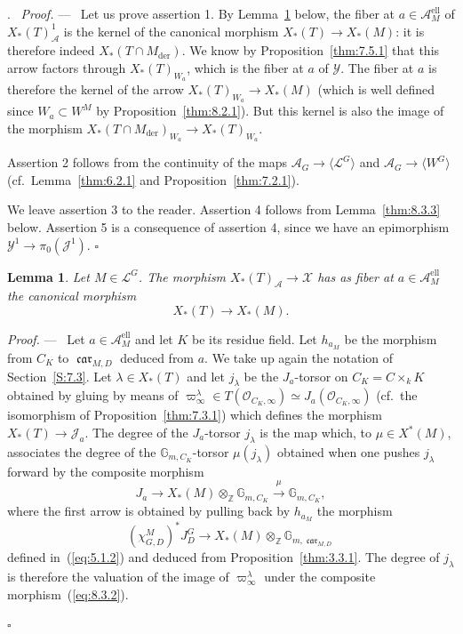 \documentclass[12pt,a4paper,oneside,english,leqno]{smfart}
\makeatletter
\numberwithin{equation}{subsection}
\newcounter{theo}
\numberwithin{theo}{subsection}
\newenvironment{paragr}[1][]{\medskip\refstepcounter{subsection}%
  \par\noindent\hspace*{\parindent}\thesubsection.\ \emph{#1}%
  \@ifundefined{@empty}{}{}\ignorespaces}{\medskip}
\theoremstyle{plain}
\newtheorem{lemma}[theo]{Lemma}
\theoremstyle{definition}
\theoremstyle{remark}
\newenvironment{preuve}[1][]{\medskip\noindent\textit{Proof.} #1 ---\ }%
  {\hfill\ensuremath{\square}\medskip}
\DeclareMathOperator{\der}{der}
\DeclareMathOperator{\el}{ell}
\DeclareMathOperator{\car}{\mathfrak{car}}
\newcommand{\ZZ}{\mathbb{Z}}
\newcommand{\oc}{\mathcal{O}}
\newcommand{\yc}{\mathcal{Y}}
\newcommand{\lc}{\mathcal{L}}
\newcommand{\Ac}{\mathcal{A}}
\newcommand{\Jc}{\mathcal{J}}
\newcommand{\xc}{\mathcal{X}}
\newcommand{\bg}{\langle}
\newcommand{\bd}{\rangle}
\makeatother
\begin{document}
\begin{paragr}
\begin{preuve}
Let us prove assertion 1. By Lemma~\ref{thm:8.3.2} below, the fiber at $a\in\Ac_M^{\el}$ of $X_*(T)^1_{\Ac}$ is the kernel of the canonical morphism $X_*(T)\to X_*(M)$: it is therefore indeed $X_*(T\cap M_{\der})$. We know by Proposition~\ref{thm:7.5.1} that this arrow factors through $X_*(T)_{W_a}$, which is the fiber at $a$ of $\yc$. The fiber at $a$ is therefore the kernel of the arrow $X_*(T)_{W_a}\to X_*(M)$ (which is well defined since $W_a\subset W^M$ by Proposition~\ref{thm:8.2.1}). But this kernel is also the image of the morphism $X_*(T\cap M_{\der})_{W_a}\to X_*(T)_{W_a}$.

Assertion 2 follows from the continuity of the maps $\Ac_G\to\bg\lc^G\bd$ and $\Ac_G\to\bg W^G\bd$ (cf.\ Lemma~\ref{thm:6.2.1} and Proposition~\ref{thm:7.2.1}).

We leave assertion 3 to the reader. Assertion 4 follows from Lemma~\ref{thm:8.3.3} below. Assertion 5 is a consequence of assertion 4, since we have an epimorphism $\yc^1\to\pi_0(\Jc^1)$.
\end{preuve}

\begin{lemma}\label{thm:8.3.2}
Let $M\in\lc^G$. The morphism $X_*(T)_{\Ac}\to\xc$ has as fiber at $a\in\Ac_M^{\el}$ the canonical morphism
$$
X_*(T)\to X_*(M).
$$
\end{lemma}

\begin{preuve}
Let $a\in\Ac_M^{\el}$ and let $K$ be its residue field. Let $h_{a_M}$ be the morphism from $C_K$ to $\car_{M,D}$ deduced from $a$. We take up again the notation of Section~\ref{S:7.3}. Let $\lambda\in X_*(T)$ and let $j_\lambda$ be the $J_a$-torsor on $C_K=C\times_k K$ obtained by gluing by means of $\varpi^\lambda_\infty\in T(\oc_{C_K,\infty})\simeq J_a(\oc_{C_K,\infty})$ (cf.\ the isomorphism of Proposition~\ref{thm:7.3.1}) which defines the morphism $X_*(T)\to\Jc_a$. The degree of the $J_a$-torsor $j_\lambda$ is the map which, to $\mu\in X^*(M)$, associates the degree of the $\mathbb{G}_{m,C_K}$-torsor $\mu(j_\lambda)$ obtained when one pushes $j_\lambda$ forward by the composite morphism
\begin{equation}\label{eq:8.3.2}
J_a\longrightarrow X_*(M)\otimes_{\ZZ}\mathbb{G}_{m,C_K}\stackrel{\mu}{\longrightarrow}\mathbb{G}_{m,C_K},
\end{equation}
where the first arrow is obtained by pulling back by $h_{a_M}$ the morphism
$$
(\chi^M_{G,D})^*J^G_D\to X_*(M)\otimes_{\ZZ}\mathbb{G}_{m,\car_{M,D}}
$$
defined in~(\ref{eq:5.1.2}) and deduced from Proposition~\ref{thm:3.3.1}. The degree of $j_\lambda$ is therefore the valuation of the image of $\varpi^\lambda_\infty$ under the composite morphism~(\ref{eq:8.3.2}).


\end{preuve}
\end{paragr}
\end{document}
